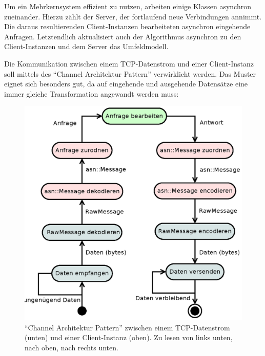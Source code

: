 Um ein Mehrkernsystem effizient zu nutzen, arbeiten einige Klassen asynchron zueinander.
Hierzu zählt der Server, der fortlaufend neue Verbindungen annimmt.
Die daraus resultierenden Client-Instanzen bearbeiteten asynchron eingehende Anfragen.
Letztendlich aktualisiert auch der Algorithmus asynchron zu den Client-Instanzen und dem Server das Umfeldmodell.

Die Kommunikation zwischen einem TCP-Datenstrom und einer Client-Instanz soll mittels des \enquote{Channel Architektur Pattern} \cite[157]{douglass2003real} verwirklicht werden.
Das Muster eignet sich besonders gut, da auf eingehende und ausgehende Datensätze eine immer gleiche Transformation angewandt werden muss:

\begin{figure}[h]
	\centering
	\includegraphics[width=\textwidth]{dia/channel}
	\caption{\enquote{Channel Architektur Pattern} zwischen einem TCP-Datenstrom (unten) und einer Client-Instanz (oben). Zu lesen von links unten, nach oben, nach rechts unten.}
	\label{design:channel}
\end{figure}


